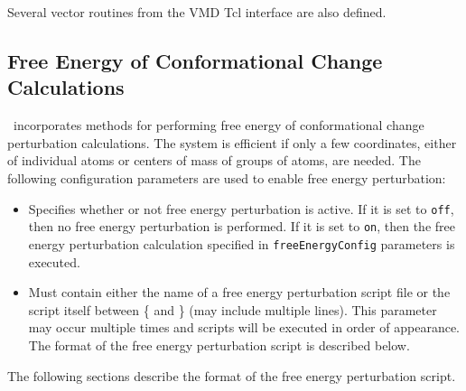 Several vector routines from the VMD Tcl interface are also defined.


\subsection{Free Energy of Conformational Change Calculations}
\label{section:fenergy}

\NAMD\ incorporates methods for performing free energy of conformational change perturbation calculations.
The system is efficient if only a few coordinates, either of individual atoms or centers of mass of groups of atoms, are needed.
The following configuration parameters are used to enable free energy perturbation:

\begin{itemize}

\item
{}
{Specifies whether or not free energy perturbation is active.  If it 
is set to {\tt off}, then no free energy perturbation is performed.  
If it is set to {\tt on}, then the free energy perturbation calculation specified in
{\tt freeEnergyConfig} parameters is executed.}

\item
{}
{Must contain either the name of a free energy perturbation script file or the script 
itself between \{ and \} (may include multiple lines).
This parameter may occur multiple times and scripts will be executed
in order of appearance.
The format of the free energy perturbation script is described below.
}

\end{itemize}

The following sections describe the format of the free energy perturbation script.





